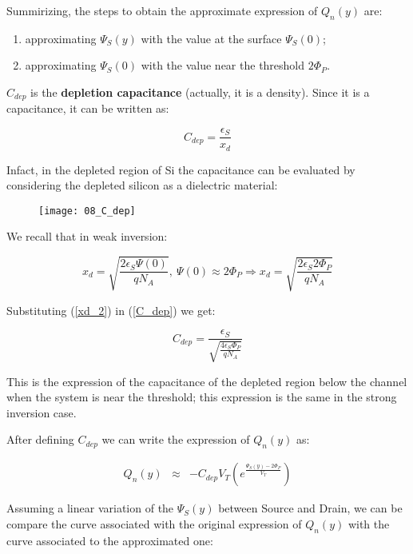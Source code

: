 \documentclass[a4paper, 12pt, twoside, openright]{report}
\begin{document}
Summirizing, the steps to obtain the approximate expression of $Q_{n}(y)$ are:
\begin{enumerate}
\item approximating $\Psi_S(y)$ with the value at the surface $\Psi_S(0)$;
\item approximating $\Psi_S(0)$ with the value near the threshold $2\Phi_P$.
\end{enumerate}

$C_{dep}$ is the \textbf{depletion capacitance} (actually, it is a density). Since it is a capacitance, it can be written as:

\begin{equation}
C_{dep} = \frac{\epsilon_S}{x_d}
\label{C_dep}
\end{equation}

Infact, in the depleted region of Si the capacitance can be evaluated by considering the depleted silicon as a dielectric material:

	\begin{figure}[H]
	\centering
	\texttt{[image: 08\_C\_dep]}
	\caption{}
	\label{}
	\end{figure}

We recall that in weak inversion:

\begin{equation}
x_d = \sqrt{\frac{2 \epsilon_S \Psi(0)}{qN_A}},\ \Psi(0) \approx 2\Phi_P \Rightarrow x_d = \sqrt{\frac{2 \epsilon_S 2\Phi_P}{qN_A}}
\label{xd_2}
\end{equation}

Substituting (\ref{xd_2}) in (\ref{C_dep}) we get:

\begin{equation}
C_{dep} = \frac{\epsilon_S}{\sqrt{\frac{4 \epsilon_S \Phi_P}{qN_A}}}
\label{}
\end{equation}

This is the expression of the capacitance of the depleted region below the channel when the system is near the threshold; this expression is the same in the strong inversion case.

After defining $C_{dep}$ we can write the expression of $Q_{n}(y)$ as:

	\begin{eqnarray*}
	Q_n(y)&\approx& -C_{dep} V_T \left(e^{\displaystyle \frac{\Psi_S(y)-2\Phi_P}{V_T}}\right)
	\end{eqnarray*}

Assuming a linear variation of the $\Psi_S(y)$ between Source and Drain, we can be compare the curve associated with the original expression of $Q_{n}(y)$ with the curve associated to the approximated one:
\end{document}

